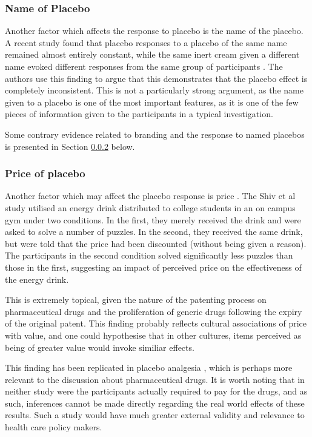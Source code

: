 \subsubsection{Name of Placebo}
\label{sec:name-placebo}



Another factor which affects the response to placebo is the name of the placebo. A recent study found that placebo responses to a placebo of the same name remained almost entirely constant, while the same inert cream given a different name evoked different responses from the same group of participants \cite{Whalley2008}. The authors use this finding to argue that this demonstrates that the placebo effect is completely inconsistent. This is not a particularly strong argument, as the name given to a placebo is one of the most important features, as it is one of the few pieces of information given to the participants in a typical investigation. %

Some contrary evidence related to branding and the response to named placebos is presented in Section \ref{sec:price} below. 


\subsubsection{Price of placebo}
\label{sec:price}

Another factor which may affect the placebo response is price \cite{Shiv2005a}. The Shiv et al study utilised an energy drink distributed to college students in an on campus gym under two conditions. In the first, they merely received the drink and were asked to solve a number of puzzles. In the second, they received the same drink, but were told that the price had been discounted (without being given a reason). The participants in the second condition solved significantly less puzzles than those in the first, suggesting an impact of perceived price on the effectiveness of the energy drink. 

This is extremely topical, given the nature of the patenting process on pharmaceutical drugs and the proliferation of generic drugs following the expiry of the original patent. This finding probably reflects cultural associations of price with value, and one could hypothesise that in other cultures, items perceived as being of greater value would invoke similiar effects.  

This finding has been replicated in placebo analgesia \cite{Waber2008}, which is perhaps more relevant to the discussion about pharmaceutical drugs. It is worth noting that in neither study were the participants actually required to pay for the drugs, and as such, inferences cannot be made directly regarding the real world effects of these results. Such a study would have much greater external validity and relevance to health care policy makers. 

